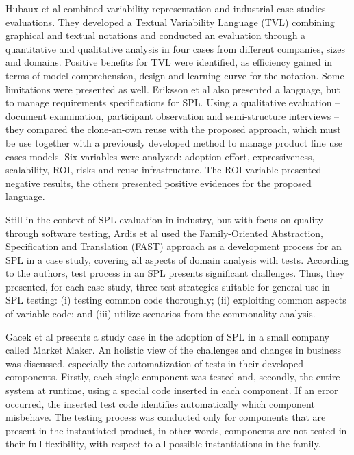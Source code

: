 Hubaux et al \cite{hubaux10} combined variability representation and industrial case studies evaluations. They developed a Textual Variability Language (TVL) combining graphical and textual notations and conducted an evaluation through a quantitative and qualitative analysis in four cases from different companies, sizes and domains. Positive benefits for TVL were identified, as efficiency gained in terms of model comprehension, design and learning curve for the notation. Some limitations were presented as well. Eriksson et al \cite{eriksson09} also presented a language, but to manage requirements specifications for SPL. Using a qualitative evaluation -- document examination, participant observation and semi-structure interviews -- they compared the clone-an-own reuse with the proposed approach, which must be use together with a previously developed method to manage product line use cases models. Six variables were analyzed: adoption effort, expressiveness, scalability, ROI, risks and reuse infrastructure. The ROI variable presented negative results, the others presented positive evidences for the proposed language. 

Still in the context of SPL evaluation in industry, but with focus on quality through software testing, Ardis et al \cite{ardis00} used the Family-Oriented Abstraction, Specification and Translation (FAST) approach as a development process for an SPL in a case study, covering all aspects of domain analysis with tests. According to the authors, test process in an SPL presents significant challenges. Thus, they presented, for each case study, three test strategies suitable for general use in SPL testing: (i) testing common code thoroughly; (ii) exploiting common aspects of variable code; and (iii) utilize scenarios from the commonality analysis. 

Gacek et al \cite{gacek01} presents a study case in the adoption of SPL in a small company called Market Maker. An holistic view of the challenges and changes in business was discussed, especially the automatization of tests in their developed components. Firstly, each single component was tested and, secondly, the entire system at runtime, using a special code inserted in each component. If an error occurred, the inserted test code identifies automatically which component misbehave. The testing process was conducted only for components that are present in the instantiated product, in other words, components are not tested in their full flexibility, with respect to all possible instantiations in the family.

